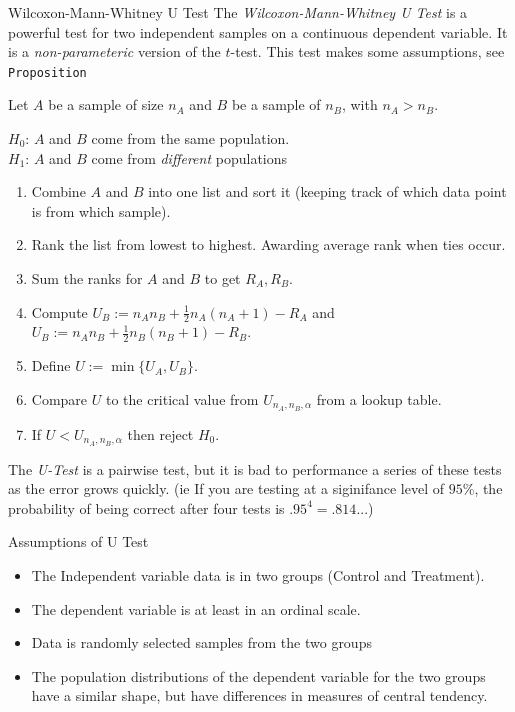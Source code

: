 \documentclass[11pt,a4paper]{article}
\begin{document}
\begin{definition}{Wilcoxon-Mann-Whitney U Test}
  The \textit{Wilcoxon-Mann-Whitney U Test} is a powerful test for two independent samples on a continuous dependent variable. It is a \textit{non-parameteric} version of the $t$-test. This test makes some assumptions, see \texttt{Proposition }
  \par Let $A$ be a sample of size $n_A$ and $B$ be a sample of $n_B$, with $n_A>n_B$.
  \begin{center}$H_0$: $A$ and $B$ come from the same population.\\$H_1$: $A$ and $B$ come from \textit{different} populations\end{center}
  \begin{enumerate}
    \item Combine $A$ and $B$ into one list and sort it (keeping track of which data point is from which sample).
    \item Rank the list from lowest to highest. Awarding average rank when ties occur.
    \item Sum the ranks for $A$ and $B$ to get $R_A,R_B$.
    \item Compute $U_B:=n_An_B+\frac12n_A(n_A+1)-R_A$ and $U_B:=n_An_B+\frac12n_B(n_B+1)-R_B$.
    \item Define $U:=\min\{U_A,U_B\}$.
    \item Compare $U$ to the critical value from $U_{n_A,n_B,\alpha}$ from a lookup table.
    \item If $U<U_{n_A,n_B,\alpha}$ then reject $H_0$.
  \end{enumerate}
  The \textit{U-Test} is a pairwise test, but it is bad to performance a series of these tests as the error grows quickly. (ie If you are testing at a siginifance level of $95\%$, the probability of being correct after four tests is $.95^4=.814...$)
\end{definition}

\begin{proposition}{Assumptions of U Test}
  \begin{itemize}
    \item The Independent variable data is in two groups (Control and Treatment).
    \item The dependent variable is at least in an ordinal scale.
    \item Data is randomly selected samples from the two groups
    \item The population distributions of the dependent variable for the two groups have a similar shape, but have differences in measures of central tendency.
  \end{itemize}
\end{proposition}
\end{document}
